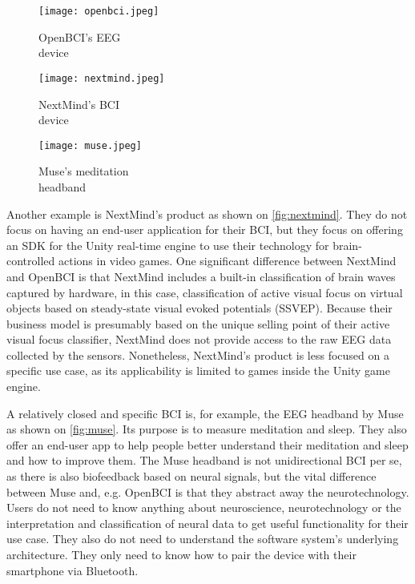 \begin{figure}[!ht]
  \texttt{[image: openbci.jpeg]}
  \caption{OpenBCI's EEG \\ device \citep{be_superhvman_conor_2017}}
  \label{fig:openbci}
  \endminipage\hfill
  \texttt{[image: nextmind.jpeg]}
  \caption{NextMind's BCI \\ device \citep{louise_neurotechnology_2019}}
  \label{fig:nextmind}
  \endminipage\hfill
  \texttt{[image: muse.jpeg]}
  \caption{Muse's meditation \\ headband \citep{muse_muse_nodate}}
  \label{fig:muse}
  \endminipage
\end{figure}

Another example is NextMind's product as shown on \autoref{fig:nextmind}. They do not focus on having an end-user application for their BCI, but they focus on offering an SDK for the Unity real-time engine to use their technology for brain-controlled actions in video games. One significant difference between NextMind and OpenBCI is that NextMind includes a built-in classification of brain waves captured by hardware, in this case, classification of active visual focus on virtual objects based on steady-state visual evoked potentials (SSVEP). Because their business model is presumably based on the unique selling point of their active visual focus classifier, NextMind does not provide access to the raw EEG data collected by the sensors. Nonetheless, NextMind's product is less focused on a specific use case, as its applicability is limited to games inside the Unity game engine.

A relatively closed and specific BCI is, for example, the EEG headband by Muse as shown on \autoref{fig:muse}. Its purpose is to measure meditation and sleep. They also offer an end-user app to help people better understand their meditation and sleep and how to improve them. The Muse headband is not unidirectional BCI per se, as there is also biofeedback based on neural signals, but the vital difference between Muse and, e.g. OpenBCI is that they abstract away the neurotechnology. Users do not need to know anything about neuroscience, neurotechnology or the interpretation and classification of neural data to get useful functionality for their use case. They also do not need to understand the software system's underlying architecture. They only need to know how to pair the device with their smartphone via Bluetooth.

